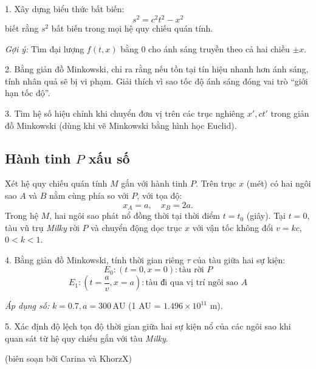 \vspace{8pt}

1. Xây dựng biểu thức bất biến:
\[
s^2 = c^2 t^2 - x^2
\]
biết rằng \(s^2\) bất biến trong mọi hệ quy chiếu quán tính.

\emph{Gợi ý:} Tìm đại lượng \(f(t,x)\) bằng 0 cho ánh sáng truyền theo cả hai chiều \(\pm x\).
\vspace{8pt}

2. Bằng giản đồ Minkowski, chỉ ra rằng nếu tồn tại tín hiệu nhanh hơn ánh sáng, tính nhân quả sẽ bị vi phạm. Giải thích vì sao tốc độ ánh sáng đóng vai trò ``giới hạn tốc độ''.
\vspace{8pt}

3. Tìm hệ số hiệu chỉnh khi chuyển đơn vị trên các trục nghiêng \(x', ct'\) trong giản đồ Minkowski (dùng khi vẽ Minkowski bằng hình học Euclid).
\vspace{8pt}

\subsection*{Hành tinh \(P\) xấu số}

Xét hệ quy chiếu quán tính \(M\) gắn với hành tinh \(P\). Trên trục \(x\) (mét) có hai ngôi sao \(A\) và \(B\) nằm cùng phía so với \(P\), với tọa độ:
\[
x_A = a, \quad x_B = 2a.
\] 
Trong hệ \(M\), hai ngôi sao phát nổ đồng thời tại thời điểm \(t = t_0\) (giây). Tại \(t=0\), tàu vũ trụ \textit{Milky} rời \(P\) và chuyển động dọc trục \(x\) với vận tốc không đổi \(v = kc\), \(0<k<1\).

4. Bằng giản đồ Minkowski, tính thời gian riêng \(\tau\) của tàu giữa hai sự kiện:
\[
E_0: (t=0, x=0): \text{tàu rời } P
\]
\[
E_1: (t = \frac{a}{v}, x=a): \text{tàu đi qua vị trí ngôi sao } A
\]

\emph{Áp dụng số:} \(k=0.7, a=300\,\mathrm{AU}\) (1 AU = \(1.496\times10^{11}\) m).
\vspace{8pt}

5. Xác định độ lệch tọa độ thời gian giữa hai sự kiện nổ của các ngôi sao khi quan sát từ hệ quy chiếu gắn với tàu \textit{Milky}.
\vspace{8pt}

\begin{flushright}
    (biên soạn bởi Carina và KhorzX)
\end{flushright}